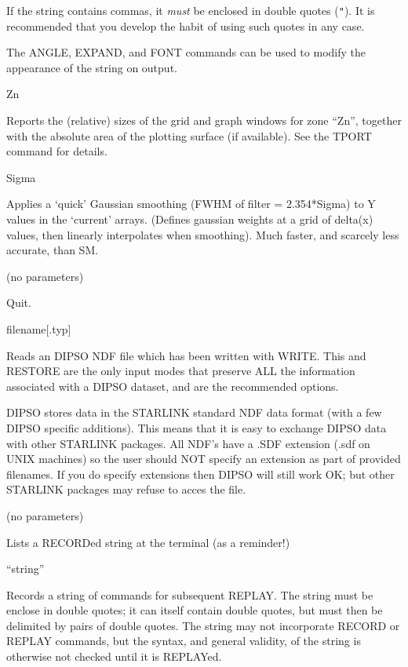 \begin {description}
If the string contains commas, it {\em must} be enclosed in double
quotes ({\tt "}). It is recommended that you develop the habit of
using such quotes in any case.

The ANGLE, EXPAND, and FONT commands can be used to modify the
appearance of the string on output.

\item [QAREA] Zn

Reports the (relative) sizes of the grid and graph windows for zone
``Zn'', together with the absolute area of the plotting surface (if
available). See the TPORT command for details.

\item [QSM] Sigma

Applies a `quick' Gaussian smoothing (FWHM of filter = 2.354*Sigma) to
Y values in the `current' arrays. (Defines gaussian weights at a grid
of delta(x) values, then linearly interpolates when smoothing). Much
faster, and scarcely less accurate, than SM.

\item [Q(U)] (no parameters)

Quit.

\item [READ] filename[.typ]

Reads an DIPSO NDF file which has been written with WRITE. This and
RESTORE are the only input modes that preserve ALL the information
associated with a DIPSO dataset, and are the recommended options.

DIPSO stores data in the STARLINK standard NDF data format (with a few
DIPSO specific additions). This means that it is easy to exchange
DIPSO data with other STARLINK packages. All NDF's have a .SDF
extension (.sdf on UNIX machines) so the user should NOT specify an
extension as part of provided filenames. If you do specify extensions
then DIPSO will still work OK; but other STARLINK packages may refuse
to acces the file.



\item [RECALL] (no parameters)

Lists a RECORDed string at the terminal (as a reminder!)

\item [RECORD] ``string''

Records a string of commands for subsequent REPLAY. The string must be
enclose in double quotes; it can itself contain double quotes, but
must then be delimited by pairs of double quotes. The string may not
incorporate RECORD or REPLAY commands, but the syntax, and general
validity, of the string is otherwise not checked until it is REPLAYed.


\end{description}
